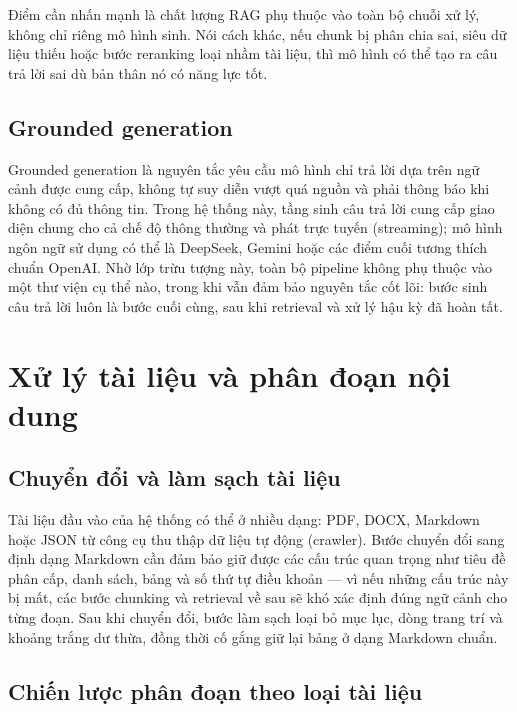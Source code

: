 \documentclass[../DoAn.tex]{subfiles}
\begin{document}
Điểm cần nhấn mạnh là chất lượng RAG phụ thuộc vào toàn bộ chuỗi xử lý, không
chỉ riêng mô hình sinh. Nói cách khác, nếu chunk bị phân chia sai, siêu dữ
liệu thiếu hoặc bước reranking loại nhầm tài liệu, thì mô hình có thể tạo ra
câu trả lời sai dù bản thân nó có năng lực tốt.

\subsection{Grounded generation}

Grounded generation là nguyên tắc yêu cầu mô hình chỉ trả lời dựa trên ngữ
cảnh được cung cấp, không tự suy diễn vượt quá nguồn và phải thông báo khi
không có đủ thông tin. Trong hệ thống này, tầng sinh câu trả lời cung cấp giao
diện chung cho cả chế độ thông thường và phát trực tuyến (streaming); mô hình
ngôn ngữ sử dụng có thể là DeepSeek, Gemini hoặc các điểm cuối tương thích
chuẩn OpenAI. Nhờ lớp trừu tượng này, toàn bộ pipeline không phụ thuộc vào
một thư viện cụ thể nào, trong khi vẫn đảm bảo nguyên tắc cốt lõi: bước sinh
câu trả lời luôn là bước cuối cùng, sau khi retrieval và xử lý hậu kỳ đã hoàn
tất.

\section{Xử lý tài liệu và phân đoạn nội dung}

\subsection{Chuyển đổi và làm sạch tài liệu}

Tài liệu đầu vào của hệ thống có thể ở nhiều dạng: PDF, DOCX, Markdown hoặc
JSON từ công cụ thu thập dữ liệu tự động (crawler). Bước chuyển đổi sang định
dạng Markdown cần đảm bảo giữ được các cấu trúc quan trọng như tiêu đề phân
cấp, danh sách, bảng và số thứ tự điều khoản --- vì nếu những cấu trúc này bị
mất, các bước chunking và retrieval về sau sẽ khó xác định đúng ngữ cảnh cho
từng đoạn. Sau khi chuyển đổi, bước làm sạch loại bỏ mục lục, dòng trang trí
và khoảng trắng dư thừa, đồng thời cố gắng giữ lại bảng ở dạng Markdown chuẩn.

\subsection{Chiến lược phân đoạn theo loại tài liệu}
\end{document}
